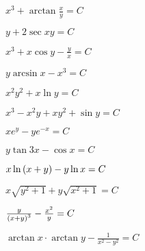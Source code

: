 \begin{enumsols}
		\item \( x^3 + \arctan{\frac{x}{y}} = C \) %
		\item \( y + 2\sec{xy} = C \) %
		\item \( x^3 + x \cos{y} - \frac{y}{x} = C \) %
		\item \( y \arcsin{x} - x^3 = C \) %
		\item \( x^2 y^2 + x \ln{y} = C \) %
		\item \( x^3 - x^2 y + xy^2 + \sin{y} = C \) %
		\item \( xe^{y} - ye^{-x} = C \) %
		\item \( y \tan{3x} - \cos{x} = C \) %
		\item \( x \ln\left( x + y \right) - y \ln{x} = C \) %
		\item \( x \sqrt{y^2 + 1} + y \sqrt{x^2 + 1} = C \) %
		\item \( \frac{y}{\left( x + y \right)^3} - \frac{x^2}{y} = C \) %
		\item \( \arctan{x} \cdot \arctan{y} - \frac{1}{x^2 - y^2} = C \) %


\end{enumsols}
